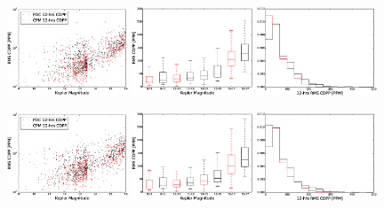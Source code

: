 \begin{figure}[p]
\begin{center}
\includegraphics[width=0.32\textwidth]{figures/cpm/f6a}
\includegraphics[width=0.32\textwidth]{figures/cpm/f6b}
\includegraphics[width=0.32\textwidth]{figures/cpm/f6c}

\includegraphics[width=0.32\textwidth]{figures/cpm/f6d}
\includegraphics[width=0.32\textwidth]{figures/cpm/f6e}
\includegraphics[width=0.32\textwidth]{figures/cpm/f6f}


\end{center}
\end{figure}
